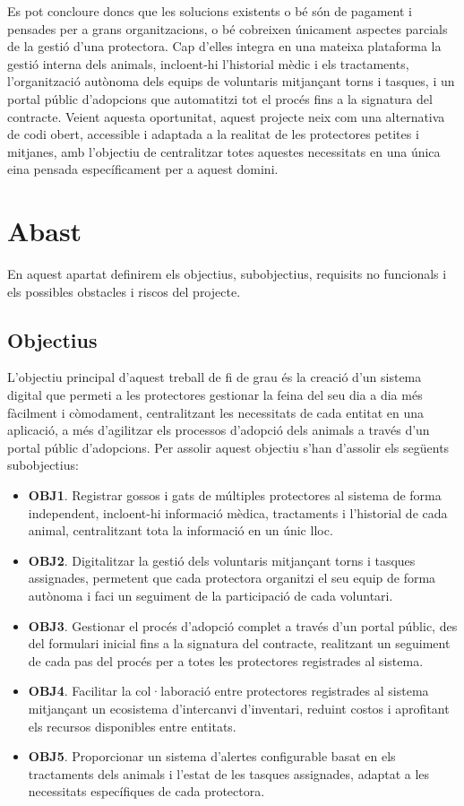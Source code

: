 \documentclass[11pt,a4paper]{report}
\begin{document}
Es pot concloure doncs que les solucions existents o bé són de pagament i pensades per a grans organitzacions, o bé cobreixen únicament aspectes parcials de la gestió d'una protectora. Cap d'elles integra en una mateixa plataforma la gestió interna dels animals, incloent-hi l'historial mèdic i els tractaments, l'organització autònoma dels equips de voluntaris mitjançant torns i tasques, i un portal públic d'adopcions que automatitzi tot el procés fins a la signatura del contracte. Veient aquesta oportunitat, aquest projecte neix com una alternativa de codi obert, accessible i adaptada a la realitat de les protectores petites i mitjanes, amb l'objectiu de centralitzar totes aquestes necessitats en una única eina pensada específicament per a aquest domini.

\newpage
\section{Abast}
En aquest apartat definirem els objectius, subobjectius, requisits no funcionals i els possibles obstacles i riscos del projecte.

\subsection{Objectius} \label{sec:objectius}
L'objectiu principal d'aquest treball de fi de grau és la creació d'un sistema digital que permeti a les protectores gestionar la feina del seu dia a dia més fàcilment i còmodament, centralitzant les necessitats de cada entitat en una aplicació, a més d'agilitzar els processos d'adopció dels animals a través d'un portal públic d'adopcions. Per assolir aquest objectiu s'han d'assolir els següents subobjectius:

\begin{itemize}
    \item \textbf{OBJ1}. Registrar gossos i gats de múltiples protectores al sistema de forma independent, incloent-hi informació mèdica, tractaments i l'historial de cada animal, centralitzant tota la informació en un únic lloc.
    \item \textbf{OBJ2}. Digitalitzar la gestió dels voluntaris mitjançant torns i tasques assignades, permetent que cada protectora organitzi el seu equip de forma autònoma i faci un seguiment de la participació de cada voluntari.
    \item \textbf{OBJ3}. Gestionar el procés d'adopció complet a través d'un portal públic, des del formulari inicial fins a la signatura del contracte, realitzant un seguiment de cada pas del procés per a totes les protectores registrades al sistema.
    \item \textbf{OBJ4}. Facilitar la col·laboració entre protectores registrades al sistema mitjançant un ecosistema d'intercanvi d'inventari, reduint costos i aprofitant els recursos disponibles entre entitats.
    \item \textbf{OBJ5}. Proporcionar un sistema d'alertes configurable basat en els tractaments dels animals i l'estat de les tasques assignades, adaptat a les necessitats específiques de cada protectora.
\end{itemize}
\end{document}
